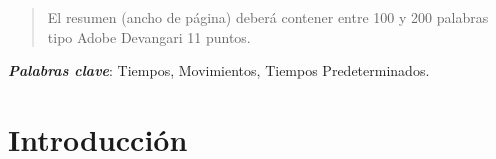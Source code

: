     \maketitle
    \thispagestyle{fancy}
    
    
    
    \begin{abstract}
    \noindent 
    El resumen (ancho de página) deberá contener entre 100 y 200 palabras tipo Adobe Devangari 11 puntos.
    
    \end{abstract}
    \textbf{\textit{Palabras clave}}: {Tiempos, Movimientos, Tiempos Predeterminados.}
    
    \section{Introducción}
    
